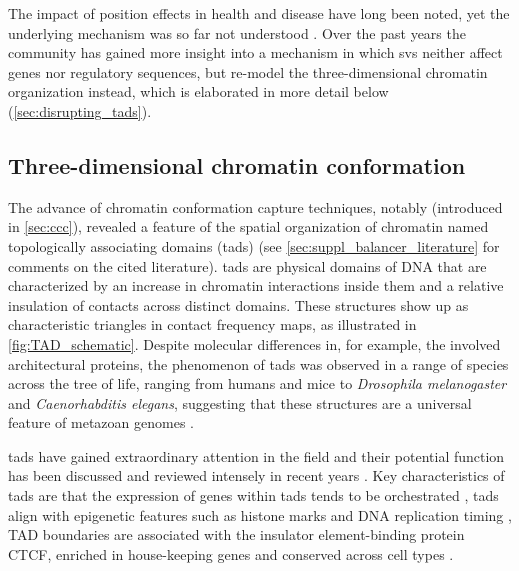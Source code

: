 The impact of position effects in health and disease have long been noted, yet
the underlying mechanism was so far not understood \citep{Kleinjan2005}.
Over the past years the community has gained more insight into a mechanism in which
\acp{sv} neither affect genes nor regulatory sequences, but re-model the
three-dimensional chromatin organization instead, which is elaborated in more
detail below (\cref{sec:disrupting_tads}).




\subsection{Three-dimensional chromatin conformation}
\label{sec:chromatin_conformation}


The advance of chromatin conformation capture techniques, notably \hic
(introduced in \cref{sec:ccc}), revealed a feature of the spatial organization
of chromatin named topologically associating domains (\acp{tad})
\citep{Dixon2012,Nora2012,Sexton2012,Rao2014a} (see
\cref{sec:suppl_balancer_literature} for comments on the cited literature).
\Acp{tad} are physical domains of
DNA that are characterized by an increase in chromatin interactions inside them
and a relative insulation of contacts across distinct domains. These structures
show up as characteristic triangles in contact frequency maps, as illustrated in
\cref{fig:TAD_schematic}. Despite molecular differences in, for example,
the involved architectural proteins, the phenomenon of \acp{tad} was observed in
a range of species across the tree of life, ranging from humans and mice to
\textit{Drosophila melanogaster} and \textit{Caenorhabditis elegans}, suggesting
that these structures are a universal feature of metazoan genomes
\citep{Dekker2015}.

\Acp{tad} have gained extraordinary attention in the field and their potential
function has been discussed and reviewed intensely in recent years
\citep[among others]{Gibcus2013,Gorkin2014,Sexton2015b,Hnisz2016a,Ruiz-Velasco2017}.
Key characteristics of \acp{tad} are that the expression of genes within
\acp{tad} tends to be orchestrated \citep[see figure 4b]{LeDily2014,Nora2012},
\acp{tad} align with epigenetic features such as histone marks \citep{Nora2012}
and DNA replication timing \citep{Pope2014,LeDily2014}, TAD boundaries are
associated with the insulator element-binding protein CTCF, enriched in
house-keeping genes and conserved across cell types
\citep{Dixon2012,Rao2014a,Schmitt2016}.

